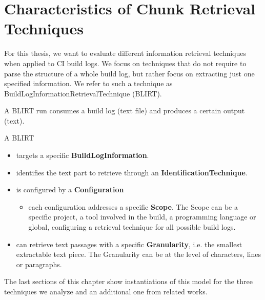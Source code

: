 \documentclass[\myrootdir/main.tex]{subfiles}
\begin{document}
\section{Characteristics of Chunk Retrieval Techniques}
\label{sec:blirt}
For this thesis, we want to evaluate different information retrieval techniques when applied to CI build logs.
We focus on techniques that do not require to parse the structure of a whole build log, but rather focus on extracting just one specified information.
We refer to such a technique as BuildLogInformationRetrievalTechnique (BLIRT).

A BLIRT run consumes a build log (text file) and produces a certain output (text).

A BLIRT
\begin{itemize}
	\item targets a specific \textbf{BuildLogInformation}.
	\item identifies the text part to retrieve through an \textbf{IdentificationTechnique}.
	\item is configured by a \textbf{Configuration}
	      \begin{itemize}
		      \item each configuration addresses a specific \textbf{Scope}.
		            The Scope can be a specific project, a tool involved in the build, a programming language or global, configuring a retrieval technique for all possible build logs.
	      \end{itemize}
	\item can retrieve text passages with a specific \textbf{Granularity}, i.e. the smallest extractable text piece.
	      The Granularity can be at the level of characters, lines or paragraphs.
\end{itemize}

The last sections of this chapter show instantiations of this model for the three techniques we analyze and an additional one from related works.

\end{document}
